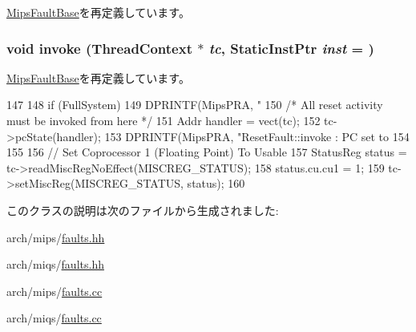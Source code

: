 \hyperlink{classMipsISA_1_1MipsFaultBase_a2bd783b42262278d41157d428e1f8d6f}{MipsFaultBase}を再定義しています。\hypertarget{classMipsISA_1_1ResetFault_a2bd783b42262278d41157d428e1f8d6f}{
\subsubsection[{invoke}]{\setlength{\rightskip}{0pt plus 5cm}void invoke ({\bf ThreadContext} $\ast$ {\em tc}, \/  {\bf StaticInstPtr} {\em inst} = {})}}
\label{classMipsISA_1_1ResetFault_a2bd783b42262278d41157d428e1f8d6f}


\hyperlink{classMipsISA_1_1MipsFaultBase_a2bd783b42262278d41157d428e1f8d6f}{MipsFaultBase}を再定義しています。


\begin{DoxyCode}
147 {
148     if (FullSystem) {
149         DPRINTF(MipsPRA, "%
150         /* All reset activity must be invoked from here */
151         Addr handler = vect(tc);
152         tc->pcState(handler);
153         DPRINTF(MipsPRA, "ResetFault::invoke : PC set to %
154     }
155 
156     // Set Coprocessor 1 (Floating Point) To Usable
157     StatusReg status = tc->readMiscRegNoEffect(MISCREG_STATUS);
158     status.cu.cu1 = 1;
159     tc->setMiscReg(MISCREG_STATUS, status);
160 }
\end{DoxyCode}


このクラスの説明は次のファイルから生成されました:\begin{DoxyCompactItemize}
\item 
arch/mips/\hyperlink{arch_2mips_2faults_8hh}{faults.hh}\item 
arch/miqs/\hyperlink{arch_2miqs_2faults_8hh}{faults.hh}\item 
arch/mips/\hyperlink{arch_2mips_2faults_8cc}{faults.cc}\item 
arch/miqs/\hyperlink{arch_2miqs_2faults_8cc}{faults.cc}\end{DoxyCompactItemize}
